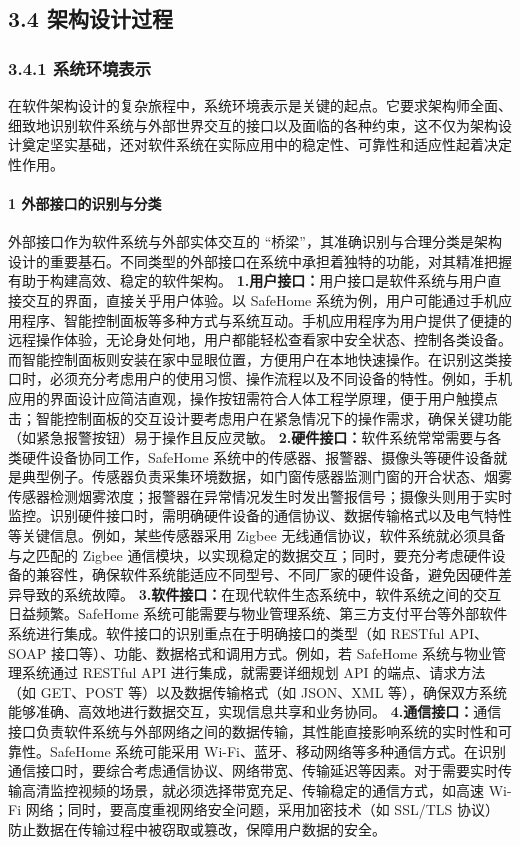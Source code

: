\subsection{3.4 架构设计过程}\label{ux67b6ux6784ux8bbeux8ba1ux8fc7ux7a0b} \subsubsection{3.4.1 系统环境表示}\label{ux7cfbux7edfux73afux5883ux8868ux793a} 在软件架构设计的复杂旅程中，系统环境表示是关键的起点。它要求架构师全面、细致地识别软件系统与外部世界交互的接口以及面临的各种约束，这不仅为架构设计奠定坚实基础，还对软件系统在实际应用中的稳定性、可靠性和适应性起着决定性作用。 \paragraph{1 外部接口的识别与分类}\label{ux5916ux90e8ux63a5ux53e3ux7684ux8bc6ux522bux4e0eux5206ux7c7b} 外部接口作为软件系统与外部实体交互的 ``桥梁''，其准确识别与合理分类是架构设计的重要基石。不同类型的外部接口在系统中承担着独特的功能，对其精准把握有助于构建高效、稳定的软件架构。 \textbf{1.用户接口：}用户接口是软件系统与用户直接交互的界面，直接关乎用户体验。以 SafeHome 系统为例，用户可能通过手机应用程序、智能控制面板等多种方式与系统互动。手机应用程序为用户提供了便捷的远程操作体验，无论身处何地，用户都能轻松查看家中安全状态、控制各类设备。而智能控制面板则安装在家中显眼位置，方便用户在本地快速操作。在识别这类接口时，必须充分考虑用户的使用习惯、操作流程以及不同设备的特性。例如，手机应用的界面设计应简洁直观，操作按钮需符合人体工程学原理，便于用户触摸点击；智能控制面板的交互设计要考虑用户在紧急情况下的操作需求，确保关键功能（如紧急报警按钮）易于操作且反应灵敏。 \textbf{2.硬件接口：}软件系统常常需要与各类硬件设备协同工作，SafeHome 系统中的传感器、报警器、摄像头等硬件设备就是典型例子。传感器负责采集环境数据，如门窗传感器监测门窗的开合状态、烟雾传感器检测烟雾浓度；报警器在异常情况发生时发出警报信号；摄像头则用于实时监控。识别硬件接口时，需明确硬件设备的通信协议、数据传输格式以及电气特性等关键信息。例如，某些传感器采用 Zigbee 无线通信协议，软件系统就必须具备与之匹配的 Zigbee 通信模块，以实现稳定的数据交互；同时，要充分考虑硬件设备的兼容性，确保软件系统能适应不同型号、不同厂家的硬件设备，避免因硬件差异导致的系统故障。 \textbf{3.软件接口：}在现代软件生态系统中，软件系统之间的交互日益频繁。SafeHome 系统可能需要与物业管理系统、第三方支付平台等外部软件系统进行集成。软件接口的识别重点在于明确接口的类型（如 RESTful API、SOAP 接口等）、功能、数据格式和调用方式。例如，若 SafeHome 系统与物业管理系统通过 RESTful API 进行集成，就需要详细规划 API 的端点、请求方法（如 GET、POST 等）以及数据传输格式（如 JSON、XML 等），确保双方系统能够准确、高效地进行数据交互，实现信息共享和业务协同。 \textbf{4.通信接口：}通信接口负责软件系统与外部网络之间的数据传输，其性能直接影响系统的实时性和可靠性。SafeHome 系统可能采用 Wi-Fi、蓝牙、移动网络等多种通信方式。在识别通信接口时，要综合考虑通信协议、网络带宽、传输延迟等因素。对于需要实时传输高清监控视频的场景，就必须选择带宽充足、传输稳定的通信方式，如高速 Wi-Fi 网络；同时，要高度重视网络安全问题，采用加密技术（如 SSL/TLS 协议）防止数据在传输过程中被窃取或篡改，保障用户数据的安全。 